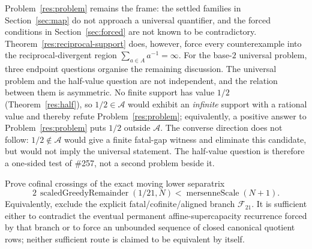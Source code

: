 \documentclass[11pt]{article}
\newcommand{\Ach}{\mathcal A}
\begin{document}
Problem~\ref{res:problem} remains the frame: the settled families in
Section~\ref{sec:map} do not approach a universal quantifier, and the forced
conditions in Section~\ref{sec:forced} are not known to be contradictory.
Theorem~\ref{res:reciprocal-support} does, however, force every counterexample
into the reciprocal-divergent region
$\sum_{a\in A}a^{-1}=\infty$.
For the base-$2$ universal problem, three endpoint questions organise the
remaining discussion.  The universal problem and the half-value question
are not independent, and the relation between them is asymmetric.  No finite
support has value $1/2$
(Theorem~\ref{res:half}), so $1/2\in\Ach$ would exhibit an \emph{infinite}
support with a rational value and thereby refute
Problem~\ref{res:problem}; equivalently, a positive answer to
Problem~\ref{res:problem} puts $1/2$ outside $\Ach$.  The converse direction
does not follow: $1/2\notin\Ach$ would give a finite fatal-gap witness and
eliminate this candidate, but would not imply the universal statement.  The
half-value question is therefore a one-sided test of \#257, not a second
problem beside it.

\begin{problem}
\label{prob:one-over-twenty-one-membership}
Prove cofinal crossings of the exact moving lower separatrix
\[
 2\,\operatorname{scaledGreedyRemainder}(1/21,N)
 <\operatorname{mersenneScale}(N+1).
\]
Equivalently, exclude the explicit fatal/cofinite/aligned branch $\mathcal F_{21}$.
It is sufficient either to contradict the eventual permanent
affine-supercapacity recurrence forced by that branch or to force an unbounded
sequence of closed canonical quotient rows; neither sufficient route is
claimed to be equivalent by itself.
\end{problem}
\end{document}
